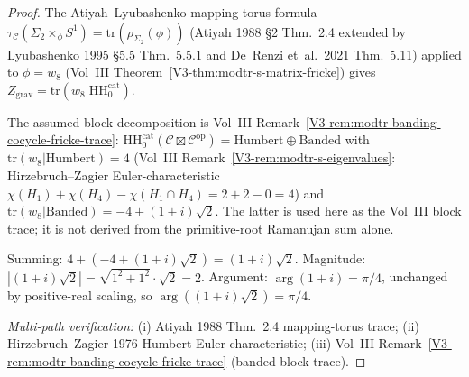 \begin{proof}
The Atiyah--Lyubashenko mapping-torus formula
$\tau_{\mathcal C}(\Sigma_2\times_\phi S^1)
= \mathrm{tr}(\rho_{\Sigma_2}(\phi))$ (Atiyah 1988 \S 2 Thm.~2.4
extended by Lyubashenko 1995 \S 5.5 Thm.~5.5.1 and De~Renzi
et~al.\ 2021 Thm.~5.11) applied to $\phi = w_8$ (Vol~III
Theorem~\ref{V3-thm:modtr-s-matrix-fricke}) gives
$Z_{\mathrm{grav}} = \mathrm{tr}(w_8|\mathrm{HH}_0^{\mathrm{cat}})$.

The assumed block decomposition is Vol~III
Remark~\ref{V3-rem:modtr-banding-cocycle-fricke-trace}:
$\mathrm{HH}_0^{\mathrm{cat}}(\mathcal C\boxtimes\mathcal C^{\mathrm{op}})
= \mathrm{Humbert}\oplus\mathrm{Banded}$ with
$\mathrm{tr}(w_8|\mathrm{Humbert}) = 4$
(Vol~III Remark~\ref{V3-rem:modtr-s-eigenvalues}: Hirzebruch--Zagier
Euler-characteristic $\chi(H_1) + \chi(H_4) - \chi(H_1\cap H_4)
= 2 + 2 - 0 = 4$) and
$\mathrm{tr}(w_8|\mathrm{Banded}) = -4 + (1+i)\sqrt 2$. The latter is
used here as the Vol~III block trace; it is not derived from the
primitive-root Ramanujan sum alone.

Summing: $4 + (-4 + (1+i)\sqrt 2) = (1+i)\sqrt 2$.
Magnitude: $|(1+i)\sqrt 2| = \sqrt{1^2 + 1^2}\cdot\sqrt 2 = 2$.
Argument: $\arg(1+i) = \pi/4$, unchanged by positive-real scaling, so
$\arg((1+i)\sqrt 2) = \pi/4$.

\emph{Multi-path verification:}
(i) Atiyah 1988 Thm.~2.4 mapping-torus trace;
(ii) Hirzebruch--Zagier 1976 Humbert Euler-characteristic;
(iii) Vol~III Remark~\ref{V3-rem:modtr-banding-cocycle-fricke-trace}
(banded-block trace).
\end{proof}

